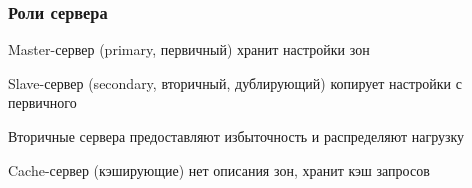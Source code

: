 \begin{frame}
    \frametitle{Роли сервера}

\begin{block} { Master-сервер (primary, первичный)}
     хранит настройки зон
\end{block}
\begin{block}{ Slave-сервер (secondary, вторичный, дублирующий)}
    копирует настройки с первичного
\end{block}
Вторичные сервера предоставляют избыточность и распределяют нагрузку
\begin{block}{Cache-сервер (кэширующие)}
нет описания зон, хранит кэш запросов
\end{block}
    

\end{frame}